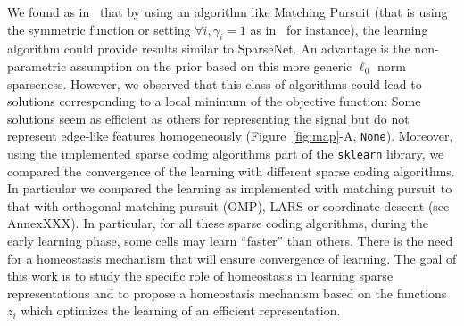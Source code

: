 \documentclass[a4paper, 11pt, draft]{article} %
\newcommand{\seeFig}[1]{Figure~\ref{fig:#1}}%
\begin{document}
We found as in~\citep{Rehn07} that by using an algorithm like Matching Pursuit (that is using the symmetric function or setting $\forall i, \gamma_i=1$ as in~\citep{Mairal11} for instance), the learning algorithm could provide results similar to {\sc SparseNet}. An advantage is the non-parametric assumption on the prior based on this more generic $\ell_0$ norm sparseness. However, we observed that this class of algorithms could lead to solutions corresponding to a local minimum of the objective function: Some solutions seem as efficient as others for representing the signal but do not represent edge-like features homogeneously (\seeFig{map}-A, \texttt{None}). %
Moreover, using the implemented sparse coding algorithms part of the \verb+sklearn+ library, we compared the convergence of the learning with different sparse coding algorithms. In particular we compared the learning as implemented with matching pursuit to that with orthogonal matching pursuit (OMP), LARS or coordinate descent (see AnnexXXX).
In particular, for all these sparse coding algorithms, during the early learning phase, some cells may learn ``faster'' than others. There is the need for a homeostasis mechanism that will ensure convergence of learning. The goal of this work is to study the specific role of homeostasis in learning sparse representations and to propose a homeostasis mechanism based on the functions $z_i$ which optimizes the learning of an efficient representation.%
\end{document}
